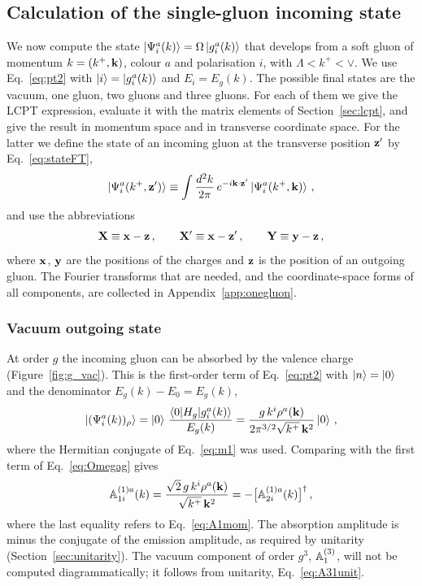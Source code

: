 \subsection{Calculation of the single-gluon incoming state}\label{sec:onegin}

We now compute the state $\ket{\Psi^a_i(k)}=\Omega\ket{g^a_i(k)}$ that develops from a soft gluon of momentum $k=(k^+,\mathbf{k})$, colour $a$ and polarisation $i$, with $\Lambda<k^+<\vee$. We use Eq.~\eqref{eq:pt2} with $\ket i=\ket{g^a_i(k)}$ and $E_i=E_g(k)$. The possible final states are the vacuum, one gluon, two gluons and three gluons. For each of them we give the LCPT expression, evaluate it with the matrix elements of Section~\ref{sec:lcpt}, and give the result in momentum space and in transverse coordinate space. For the latter we define the state of an incoming gluon at the transverse position $\mathbf{z}'$ by Eq.~\eqref{eq:stateFT},
\begin{align}
\ket{\Psi^a_i(k^+,\mathbf{z}')}\equiv\int\frac{d^2k}{2\pi}\,e^{-i\mathbf{k}\cdot\mathbf{z}'}\ket{\Psi^a_i(k^+,\mathbf{k})}\,,
\end{align}
and use the abbreviations
\begin{align}\label{eq:XY}
\mathbf{X}\equiv\mathbf{x}-\mathbf{z}\,,\qquad \mathbf{X}'\equiv\mathbf{x}-\mathbf{z}'\,,\qquad \mathbf{Y}\equiv\mathbf{y}-\mathbf{z}\,,
\end{align}
where $\mathbf{x}$, $\mathbf{y}$ are the positions of the charges and $\mathbf{z}$ is the position of an outgoing gluon. The Fourier transforms that are needed, and the coordinate-space forms of all components, are collected in Appendix~\ref{app:onegluon}.

\subsubsection{Vacuum outgoing state}\label{sec:vacout}

At order $g$ the incoming gluon can be absorbed by the valence charge (Figure~\ref{fig:g_vac}). This is the first-order term of Eq.~\eqref{eq:pt2} with $\ket n=\ket0$ and the denominator $E_g(k)-E_0=E_g(k)$,
\begin{align}\label{eq:psi_rho}
\ket{(\Psi^a_i(k))_\rho}=\ket0\,\frac{\braket{0|H_g|g^a_i(k)}}{E_g(k)}=\frac{g\,k^i\rho^a(\mathbf{k})}{2\pi^{3/2}\sqrt{k^+}\,\mathbf{k}^2}\ket0\,,
\end{align}
where the Hermitian conjugate of Eq.~\eqref{eq:m1} was used. Comparing with the first term of Eq.~\eqref{eq:Omegag} gives
\begin{align}\label{eq:A11mom}
\mathbb{A}^{(1)a}_{1i}(k)=\frac{\sqrt2\,g\,k^i\rho^a(\mathbf{k})}{\sqrt{k^+}\,\mathbf{k}^2}=-\big[\mathbb{A}^{(1)a}_{2i}(k)\big]^\dagger\,,
\end{align}
where the last equality refers to Eq.~\eqref{eq:A1mom}. The absorption amplitude is minus the conjugate of the emission amplitude, as required by unitarity (Section~\ref{sec:unitarity}). The vacuum component of order $g^3$, $\mathbb{A}^{(3)}_1$, will not be computed diagrammatically; it follows from unitarity, Eq.~\eqref{eq:A31unit}.

